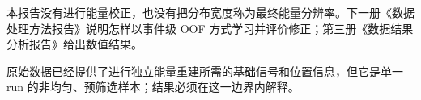 \documentclass[UTF8,11pt,a4paper,oneside,fontset=none]{ctexart}
\begin{document}
\begin{scopebox}
本报告没有进行能量校正，也没有把分布宽度称为最终能量分辨率。下一册《数据处理方法报告》说明怎样以事件级 OOF 方式学习并评价修正；第三册《数据结果分析报告》给出数值结果。
\end{scopebox}

\begin{conclusionbox}
原始数据已经提供了进行独立能量重建所需的基础信号和位置信息，但它是单一 run 的非均匀、预筛选样本；结果必须在这一边界内解释。
\end{conclusionbox}
\clearpage
\end{document}
